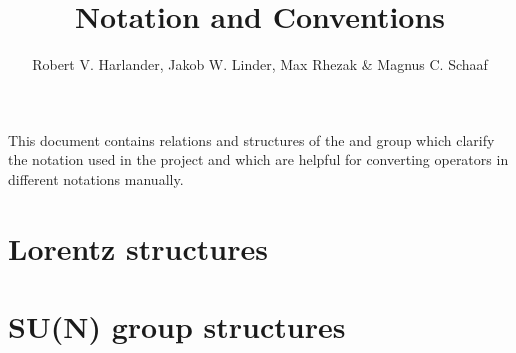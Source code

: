 \documentclass[a4paper, 11pt, twoside]{article}
\title{Notation and Conventions}
\author{Robert V. Harlander, Jakob W. Linder, Max Rhezak \& Magnus C. Schaaf}
\date{}
\numberwithin{equation}{section} %
\begin{document}
	\maketitle
	\tableofcontents
	\par
	\vspace{2em}
%	
	This document contains relations and structures of the \SLtwoC{} and  group which clarify the notation used in the \autoeft{} project and which are helpful for converting operators in different notations manually.
%	
	\section{Lorentz structures} \label{sec:LSymmetry}
		
		\clearpage
	\section{SU(N) group structures} \label{sec:GSymmetry}
		
	\printbibliography
\end{document}
